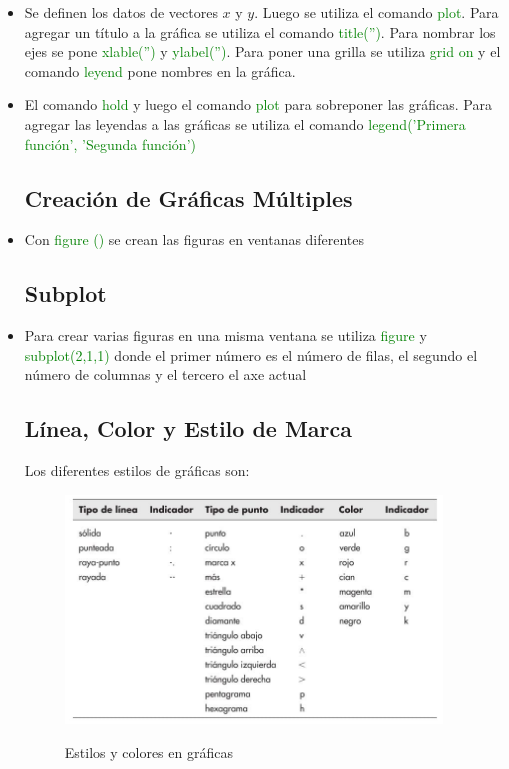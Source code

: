 \documentclass{article}
\begin{document}
	\begin{itemize}
	\item Se definen los datos de vectores  $x$ y $y$. Luego se utiliza el comando \textcolor{green}{plot}. Para agregar un título a la gráfica se utiliza el comando \textcolor{green}{title('')}. Para nombrar los ejes se pone \textcolor{green}{xlable('')} y \textcolor{green}{ylabel('')}. Para poner una grilla se utiliza \textcolor{green}{grid on} y el comando \textcolor{green}{leyend} pone nombres en la gráfica.
	
	\item El comando \textcolor{green}{hold} y luego el comando \textcolor{green}{plot} para sobreponer las gráficas. Para agregar las leyendas a las gráficas se utiliza el comando \textcolor{green}{legend('Primera función', 'Segunda función')}
	
	\subsection{Creación de Gráficas Múltiples}
	
	\item Con \textcolor{green}{figure ()} se crean las figuras en ventanas diferentes
	
	\subsection{Subplot}
	
	\item Para crear varias figuras en una misma ventana se utiliza \textcolor{green}{figure} y \textcolor{green}{subplot(2,1,1)} donde el primer número es el número de filas, el segundo el número de columnas y el tercero el axe actual
	
	\subsection{Línea, Color y Estilo de Marca}
	
	Los diferentes estilos de gráficas son:
	
	\begin{figure}[h!]
		\centering
		\includegraphics[width = 100mm]{imagenes/atributos-MATLAB}
		\label{estilos}
		\caption{Estilos y colores en gráficas}
	\end{figure}


\end{itemize}
\end{document}
